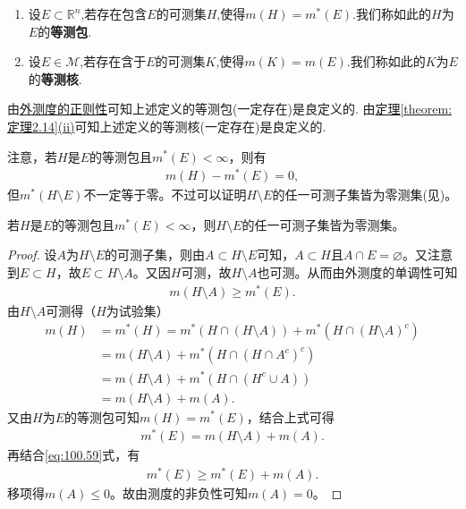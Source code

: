 \documentclass[../../main.tex]{subfiles}
\begin{document}
\begin{definition}[等测包与等测核]
\begin{enumerate}
\item 设$E\subset \mathbb{R}^n$,若存在包含$E$的可测集$H$,使得$m(H)=m^*(E)$.我们称如此的$H$为$E$的\textbf{等测包}.

\item 设$E\in \mathscr{M}$,若存在含于$E$的可测集$K$,使得$m(K)=m(E)$.我们称如此的$K$为$E$的\textbf{等测核}.
\end{enumerate}
\end{definition}
\begin{note}
由\hyperref[theorem:外测度的正则性]{外测度的正则性}可知上述定义的等测包(一定存在)是良定义的.
由\hyperref[theorem:定理2.14]{定理\ref{theorem:定理2.14}(ii)}可知上述定义的等测核(一定存在)是良定义的.
\end{note}
\begin{remark}
注意，若\(H\)是\(E\)的等测包且\(m^*(E)<\infty\)，则有
\begin{align*}
m(H) - m^*(E) = 0,
\end{align*}
但\(m^*(H\setminus E)\)不一定等于零。不过可以证明\(H\setminus E\)的任一可测子集皆为零测集(见)。
\end{remark}

\begin{proposition}\label{proposition:等测包与原集合差的可测子集必为零测集}
若\(H\)是\(E\)的等测包且\(m^*(E)<\infty\)，则\(H\setminus E\)的任一可测子集皆为零测集。
\end{proposition}
\begin{proof}
设\(A\)为\(H\setminus E\)的可测子集，则由\(A\subset H\setminus E\)可知，\(A\subset H\)且\(A\cap E=\varnothing\)。又注意到\(E\subset H\)，故\(E\subset H\setminus A\)。又因\(H\)可测，故\(H\setminus A\)也可测。从而由外测度的单调性可知
\begin{align}
m(H\setminus A)\geqslant m^*(E).\label{eq:100.59}
\end{align}
由\(H\setminus A\)可测得（\(H\)为试验集）
\begin{align*}
m(H)&=m^*(H)=m^*(H\cap(H\setminus A))+m^*(H\cap(H\setminus A)^c)\\
&=m(H\setminus A)+m^*(H\cap(H\cap A^c)^c)
\\
&=m(H\setminus A)+m^*(H\cap(H^c\cup A))\\
&=m(H\setminus A)+m(A).
\end{align*}
又由\(H\)为\(E\)的等测包可知\(m(H)=m^*(E)\)，结合上式可得
\begin{align*}
m^*(E)=m(H\setminus A)+m(A).
\end{align*}
再结合\eqref{eq:100.59}式，有
\begin{align*}
m^*(E)\geqslant m^*(E)+m(A).
\end{align*}
移项得\(m(A)\leqslant0\)。故由测度的非负性可知\(m(A)=0\)。
\end{proof}
\end{document}
